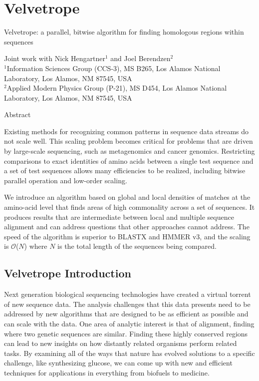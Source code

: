 \documentclass[phd,tocprelim]{cornell}
\begin{document}


\part{Velvetrope} %
\label{prt:Velvetrope}
\singlespacing

\noindent
\Large
Velvetrope: a parallel, bitwise algorithm for finding homologous regions within sequences

\noindent
\normalsize
Joint work with Nick Hengartner$^{1}$ and Joel Berendzen$^{2}$ \\
\scriptsize
$^{1}$Information Sciences Group (CCS-3), MS B265, Los Alamos National
 Laboratory, Los Alamos, NM 87545, USA \\
$^{2}$Applied Modern Physics Group (P-21), MS D454, Los Alamos National
 Laboratory, Los Alamos, NM 87545, USA
\normalsize

\normalspacing

\begin{center}
   Abstract 
\end{center}

Existing methods for recognizing common patterns in sequence data
streams do not scale well. This scaling problem becomes critical for
problems that are driven by large-scale sequencing, such as
metagenomics and cancer genomics.  Restricting comparisons to exact
identities of amino acids between a single test sequence and a set of
test sequences allows many efficiencies to be realized, including
bitwise parallel operation and low-order scaling.

We introduce an algorithm based on global and local densities of
matches at the amino-acid level that finds areas of high commonality
across a set of sequences.  It produces results that are intermediate
between local and multiple sequence alignment and can address
questions that other approaches cannot address.  The speed of the
algorithm is superior to BLASTX and HMMER v3, and the scaling is
$\mathcal{O}$($N$) where $N$ is the total length of the sequences
being compared.

\chapter{Velvetrope Introduction} %
\label{cha:Velvetrope Introduction}

Next generation biological sequencing technologies have created a virtual torrent of new sequence data. The analysis challenges that this data presents need to be addressed by new algorithms that are designed to be as efficient as possible and can scale with the data. One area of analytic interest is that of alignment, finding where two genetic sequences are similar. Finding these highly conserved regions can lead to new insights on how distantly related organisms perform related tasks. By examining all of the ways that nature has evolved solutions to a specific challenge, like synthesizing glucose, we can come up with new and efficient techniques for applications in everything from biofuels to medicine.
\end{document}
